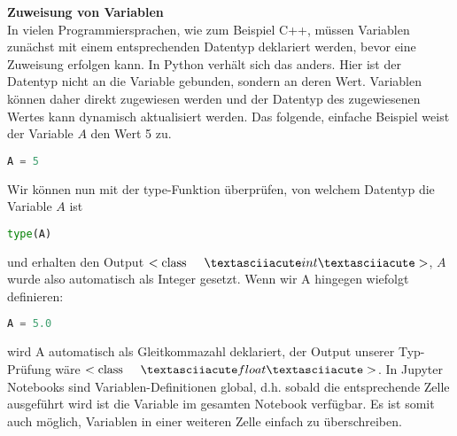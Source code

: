 \textbf{Zuweisung von Variablen} \\
In vielen Programmiersprachen, wie zum Beispiel C++, müssen Variablen zunächst mit einem entsprechenden Datentyp deklariert werden, bevor eine Zuweisung erfolgen kann.  In Python verhält sich das anders. Hier ist der Datentyp nicht an die Variable gebunden, sondern an deren Wert. Variablen können daher direkt zugewiesen werden und der Datentyp des zugewiesenen Wertes kann dynamisch aktualisiert werden.  Das folgende, einfache Beispiel weist der Variable $A$ den Wert 5 zu. 
\begin{lstlisting}[language = Python]
A = 5 
\end{lstlisting}  
Wir können nun mit der type-Funktion überprüfen, von welchem Datentyp die Variable $A$ ist
\begin{lstlisting}[language = Python]
type(A)
\end{lstlisting}  
und erhalten den Output $<\mathrm{class} \hspace{0.5cm} ´int´>$, $A$ wurde also automatisch als Integer gesetzt. Wenn wir A hingegen wiefolgt definieren:
\begin{lstlisting}[language = Python]
A = 5.0
\end{lstlisting}  
wird A automatisch als Gleitkommazahl deklariert, der Output unserer Typ-Prüfung wäre $<\mathrm{class} \hspace{0.5cm} ´float´>$.  In Jupyter Notebooks sind Variablen-Definitionen global, d.h. sobald die entsprechende Zelle ausgeführt wird ist die Variable im gesamten Notebook verfügbar. Es ist somit auch möglich, Variablen in einer weiteren Zelle einfach zu überschreiben. \\


